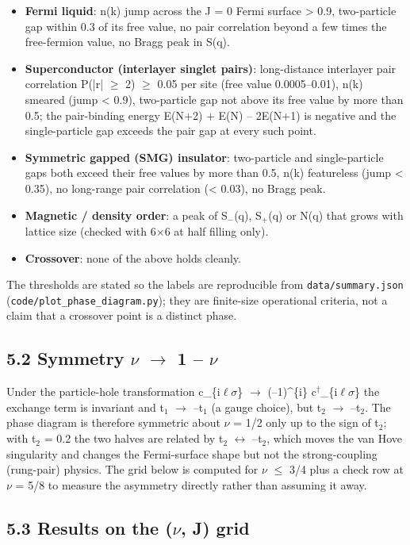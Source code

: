 \documentclass[10pt]{article}
\begin{document}
\begin{itemize}
\item \textbf{Fermi liquid}: n(k) jump across the J = 0 Fermi surface > 0.9, two-particle gap within 0.3 of its free
value, no pair correlation beyond a few times the free-fermion value, no Bragg peak in S(q).
\item \textbf{Superconductor (interlayer singlet pairs)}: long-distance interlayer pair correlation P(|r| $\ge$ 2) $\ge$ 0.05 per
site (free value 0.0005--0.01), n(k) smeared (jump < 0.9), two-particle gap not above its free value by more
than 0.5; the pair-binding energy E(N+2) + E(N) -- 2E(N+1) is negative and the single-particle gap exceeds the
pair gap at every such point.
\item \textbf{Symmetric gapped (SMG) insulator}: two-particle and single-particle gaps both exceed their free values by
more than 0.5, n(k) featureless (jump < 0.35), no long-range pair correlation (< 0.03), no Bragg peak.
\item \textbf{Magnetic / density order}: a peak of S$_-$(q), S$_+$(q) or N(q) that grows with lattice size (checked with 6$\times$6
at half filling only).
\item \textbf{Crossover}: none of the above holds cleanly.
\end{itemize}
The thresholds are stated so the labels are reproducible from \texttt{data/summary.json} (\texttt{code/plot\_phase\_diagram.py}); they are finite-size operational criteria, not a claim that a crossover point is a distinct phase.

\subsection*{5.2 Symmetry $\nu$ $\to$ 1 -- $\nu$}

Under the particle-hole transformation c\_\{i$\ell$$\sigma$\} $\to$ (--1)\^{}\{i\} c$^\dagger$\_\{i$\ell$$\sigma$\} the exchange term is invariant and t$_1$ $\to$ --t$_1$ (a gauge choice), but t$_2$ $\to$ --t$_2$. The phase diagram is therefore symmetric about $\nu$ = 1/2 only up to the sign of t$_2$; with t$_2$ = 0.2 the two halves are related by t$_2$ $\leftrightarrow$ --t$_2$, which moves the van Hove singularity and changes the Fermi-surface shape but not the strong-coupling (rung-pair) physics. The grid below is computed for $\nu$ $\le$ 3/4 plus a check row at $\nu$ = 5/8 to measure the asymmetry directly rather than assuming it away.


\subsection*{5.3 Results on the ($\nu$, J) grid}
\end{document}
